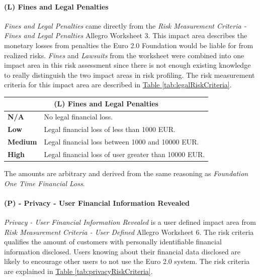 \documentclass[a4paper,12pt]{article} %
\newcommand{\hypertableref}[1]{\hyperref[#1]{Table \ref{#1}}}
\begin{document}
{\paragraph{(L) Fines and Legal Penalties}

\textit{Fines and Legal Penalties} came directly from the \textit{Risk Measurement Criteria - Fines and Legal Penalties} Allegro Worksheet 3. This impact area describes the monetary losses from penalties the Euro 2.0 Foundation would be liable for from realized risks. \textit{Fines} and \textit{Lawsuits} from the worksheet were combined into one impact area in this risk assessment since there is not enough existing knowledge to really distinguish the two impact areas in risk profiling. The risk measurement criteria for this impact area are described in \hypertableref{tab:legalRiskCriteria}.

\begin{center}
\begin{tabular}{ | l | p{12cm} | }
  \hline
  \multicolumn{2}{|c|}{\textbf{(L) Fines and Legal Penalties}}
  \\ \hline
  \textbf{N/A} & No legal financial loss.
  \\ \hline
  \textbf{Low} & Legal financial loss of less than 1000 EUR.
  \\ \hline
  \textbf{Medium} & Legal financial loss between 1000 and 10000 EUR.
  \\ \hline
  \textbf{High} & Legal financial loss of user greater than 10000 EUR.
  \\ \hline
\end{tabular}
\end{center}
\label{tab:legalRiskCriteria}

The amounts are arbitrary and derived from the same reasoning as \textit{Foundation One Time Financial Loss}.

\paragraph{(P) - Privacy - User Financial Information Revealed}

\textit{Privacy - User Financial Information Revealed} is a user defined impact area from \textit{Risk Measurement Criteria - User Defined} Allegro Worksheet 6. The risk criteria qualifies the amount of customers with personally identifiable financial information disclosed. Users knowing about their financial data disclosed are likely to encourage other users to not use the Euro 2.0 system. The risk criteria are explained in \hypertableref{tab:privacyRiskCriteria}.

}
\end{document}
